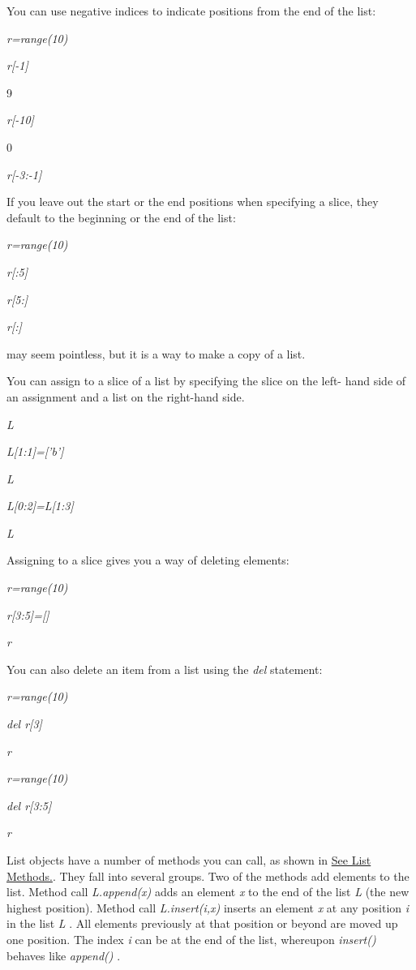 You can use negative indices to
indicate positions from the end of the list:


\emph{r=range(10)}


\emph{r{[}-1{]}}

9


\emph{r{[}-10{]}}

0


\emph{r{[}-3:-1{]}}



If you leave out the start or the
end positions when specifying a slice, they default to the beginning or
the end of the list:


\emph{r=range(10)}


\emph{r{[}:5{]}}




\emph{r{[}5:{]}}




\emph{r{[}:{]}}



 may seem
pointless, but it is a way to make a copy of a list.

You can assign to a slice of a list
by specifying the slice on the left- hand side of an assignment and a
list on the right-hand side.


\emph{L}




\emph{L{[}1:1{]}={[}'b'{]}}


\emph{L}




\emph{L{[}0:2{]}=L{[}1:3{]}}


\emph{L}



Assigning to a slice gives you a
way of deleting elements:


\emph{r=range(10)}


\emph{r{[}3:5{]}={[}{]}}


\emph{r}



You can also delete an item from a
list using the \emph{del} statement:


\emph{r=range(10)}


\emph{del r{[}3{]}}


\emph{r}




\emph{r=range(10)}


\emph{del r{[}3:5{]}}


\emph{r}



List objects have a number of
methods you can call, as shown in \href{chap2.html\#20881}{See List
Methods.}. They fall into several groups. Two of the methods add
elements to the list. Method call \emph{L.append(x)} adds an element
\emph{x} to the end of the list \emph{L} (the new highest position).
Method call \emph{L.insert(i,x)} inserts an element \emph{x} at any
position \emph{i} in the list \emph{L} . All elements previously at that
position or beyond are moved up one position. The index \emph{i} can be
at the end of the list, whereupon \emph{insert()} behaves like
\emph{append()} .

